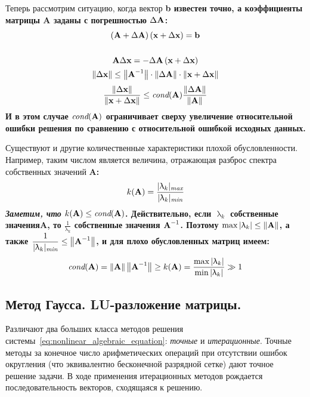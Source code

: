 Теперь рассмотрим ситуацию, когда вектор \bf{b} известен точно, а коэффициенты матрицы \bf{A} заданы с погрешностью
$\Delta \bf{A}$:
\begin{gather*}
    \left( \bf{A} + \Delta \bf{A} \right)\left( \bf{x} + \Delta \bf{x} \right) = \bf{b}\\
    \\
    \bf{A}\Delta \bf{x} = - \Delta \bf{A} \left( \bf{x} + \Delta \bf{x} \right)\\
    \left\| \Delta \bf{x} \right\| \leq \left\| \bf{A}^{-1} \right\| \cdot \left\| \Delta \bf{A} \right\| \cdot \left\| \bf{x} + \Delta \bf{x} \right\|
\end{gather*}
\begin{equation}
    \frac{\left\| \Delta \bf{x} \right\|}{\left\| \bf{x} + \Delta \bf{x} \right\|} \leq \textit{cond}(\bf{A}) \frac{\left\| \Delta \bf{A} \right\|}{\left\| \bf{A} \right\|}
\end{equation}
И в этом случае $\textit{cond}(\bf{A})$ ограничивает сверху увеличение относительной ошибки решения по сравнению с
относительной ошибкой исходных данных.
\vspace{10pt}

Существуют и другие количественные характеристики плохой обусловленности. Например, таким числом является величина,
отражающая разброс спектра собственных значений \bf{A}:
\begin{equation*}
    k(\bf{A}) = \frac{\displaystyle |\uplambda_k|_{\textit{max}}}{\displaystyle |\uplambda_k|_{\textit{min}}}
\end{equation*}
\emph{Заметим, что} $k(\bf{A}) \leq \textit{cond}(\bf{A})$. Действительно, если $\uplambda_k$ собственные значения\bf{A}, то
$\displaystyle \frac{1}{\uplambda_k}$ собственные значения $\bf{A}^{-1}$. Поэтому
$\displaystyle \max |\uplambda_k| \leq \left\| \bf{A} \right\|$, а также $\displaystyle \frac{1}{|\uplambda_k|_{\textit{min}}} \leq \left\| \bf{A}^{-1} \right\|$,
и для плохо обусловленных матриц имеем:
\begin{equation*}
    \textit{cond}(\bf{A}) = \left\| \bf{A} \right\| \left\| \bf{A}^{-1} \right\| \geq k(\bf{A}) = \frac{\max|\uplambda_k|}{\min|\uplambda_k|} \gg 1
\end{equation*}

\subsection{Метод Гаусса. \textbf{LU}-разложение матрицы.}
Различают два больших класса методов решения системы~\eqref{eq:nonlinear_algebraic_equation}: \emph{точные} и
\emph{итерационные}. Точные методы за конечное число арифметических операций при отсутствии ошибок округления (что
эквивалентно бесконечной разрядной сетке) дают точное решение задачи. В ходе применения итерационных методов рождается
последовательность векторов, сходящаяся к решению.

